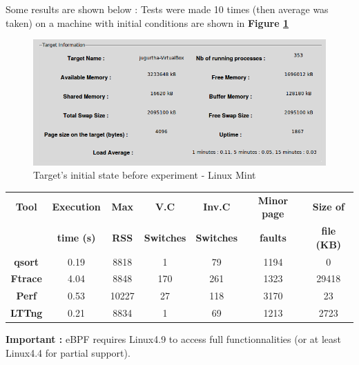 Some results are shown below :
Tests were made 10 times (then average was taken) on a machine with initial conditions are shown in \textbf{Figure \ref{Target's initial state before experiment - Linux Mint}}

     		\begin{figure}[H]
					\centering
        			\includegraphics[scale=0.45]{img/solution/cmptracers-target-information.png}
        			\caption{Target's initial state before experiment - Linux Mint}
        			\label{Target's initial state before experiment - Linux Mint}
   			 \end{figure}

						\begin{center}
							\begin{tabular}{|c|c|c|c|c|c|c|}
								\hline
								\textbf{Tool} & \textbf{Execution} & \textbf{Max}  & \textbf{V.C} & \textbf{Inv.C} & \textbf{Minor page} & \textbf{Size of}\\
							& 	\textbf{time (s)} & \textbf{RSS} & \textbf{Switches} & \textbf{Switches} & \textbf{faults} & \textbf{file (KB)} \\
								   	
								\hline
	    						\textbf{qsort} & 0.19 & 8818 & 1 & 79 & 1194 &  0 \\								   		
   								\hline
	    						\textbf{Ftrace} & 4.04 & 8848 & 170 & 261 & 1323 & 29418  \\
								\hline     
        						
   								\textbf{Perf} & 0.53 & 10227 & 27 & 118 & 3170 & 23 \\
   								\hline
   								
   								\textbf{LTTng} & 0.21 & 8834 & 1 & 69 & 1213 & 2723 \\
   								\hline		
							\end{tabular}
						\end{center}


\textbf{\color{red}Important : } eBPF requires Linux4.9 to access full functionnalities (or at least Linux4.4 for partial support).

